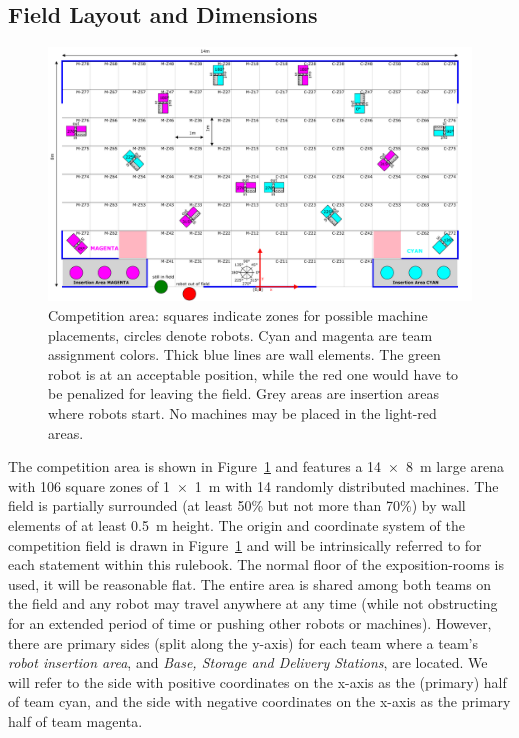\documentclass[12pt,twoside]{article}
\newcommand{\reffig}[1]{Figure~\ref{#1}}
\begin{document}
\subsection{Field Layout and Dimensions}
\label{sec:competition-area}
\begin{figure}[p]
    \includegraphics[width=\paperwidth, angle=-90, trim=0 0 0 0,]{field2017.pdf}
    \vspace{1ex}
    \caption{Competition area: squares indicate zones for possible
      machine placements, circles denote robots. Cyan and magenta are
      team assignment colors. Thick blue lines are wall elements. The
      green robot is at an acceptable position, while the red one
      would have to be penalized for leaving the field. Grey areas are
      insertion areas where robots start. No machines may be placed in
      the light-red areas.}
    \label{fig:competition-area}
\end{figure}
The competition area is shown in \reffig{fig:competition-area} and
features a \SI{14 x 8}{\metre} large arena with 106 square zones %
of \SI{1 x 1}{\metre} with 14 randomly distributed machines. The %
field is partially surrounded (at least 50\% but not more than 70\%)
by wall elements of at least \SI{0.5}{\metre} height.  The origin and
coordinate system of the competition field is drawn in
\reffig{fig:competition-area} and will be intrinsically referred to
for each statement within this rulebook. The normal floor of the
exposition-rooms is used, it will be reasonable flat. The entire area
is shared among both teams on the field and any robot may travel
anywhere at any time (while not obstructing for an extended period of
time or pushing other robots or machines). However, there are primary
sides (split along the y-axis) for each team where a team's
\textit{robot insertion area}, and \textit{Base, Storage and Delivery
  Stations}, are located. We will refer to the side with positive
coordinates on the x-axis as the (primary) half of team cyan, and the
side with negative coordinates on the x-axis as the primary half of
team magenta.
\end{document}
